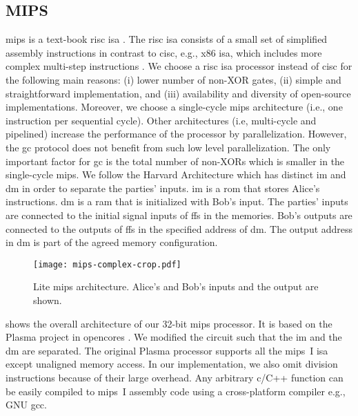 \subsection{MIPS}\label{ssec:processor-mips}
\gls{mips} is a text-book \acrfull{risc} \acrshort{isa} \cite{kane1992mips}.
The \acrshort{risc} \acrshort{isa} consists of a small set of simplified assembly instructions in contrast to \acrfull{cisc}, e.g., x86 \acrshort{isa}, which includes more complex multi-step instructions \cite{hennessy2012computer}.
We choose a \acrshort{risc} \acrshort{isa} processor instead of \acrshort{cisc} for the following main reasons: (i) lower number of non-XOR gates, (ii) simple and straightforward implementation, and (iii) availability and diversity of open-source implementations.
Moreover, we choose a single-cycle \gls{mips} architecture (i.e., one instruction per sequential cycle).
Other architectures (i.e, multi-cycle and pipelined) increase the performance of the processor by parallelization.
However, the \acrshort{gc} protocol does not benefit from such low level parallelization.
The only important factor for \acrshort{gc} is the total number of non-XORs which is smaller in the single-cycle \gls{mips}.
We follow the Harvard Architecture which has distinct \acrfull{im} and \acrfull{dm} in order to separate the parties' inputs.
\acrshort{im} is a \acrfull{rom} that stores Alice's instructions.
\acrshort{dm} is a \acrfull{ram} that is initialized with Bob's input.
The parties' inputs are connected to the initial signal inputs of \acrshort{ff}s in the memories.
Bob's outputs are connected to the outputs of \acrshort{ff}s in the specified address of \acrshort{dm}.
The output address in \acrshort{dm} is part of the agreed memory configuration.

\begin{figure}
\centering
\texttt{[image: mips-complex-crop.pdf]}
\caption{Lite \gls{mips} architecture.
  Alice's and Bob's inputs and the output are shown.}\label{figure:mips}
\end{figure}

 shows the overall architecture of our 32-bit \gls{mips} processor.
It is based on the Plasma project in opencores \cite{rhoads2006plasma}.
We modified the circuit such that the \acrshort{im} and the \acrshort{dm} are separated.
The original Plasma processor supports all the \gls{mips}~I \acrshort{isa} except unaligned memory access.
In our implementation, we also omit division instructions because of their large overhead.
Any arbitrary \gls{c}/C++ function can be easily compiled to \gls{mips}~I assembly code using a cross-platform compiler e.g., GNU gcc.

